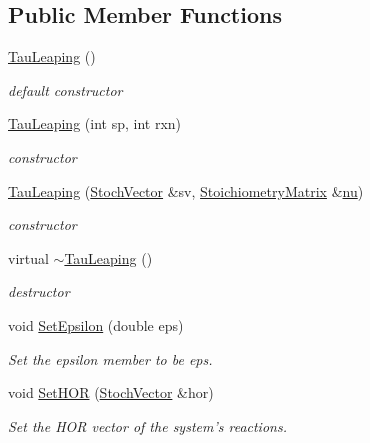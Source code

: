 \subsection*{Public Member Functions}
\begin{CompactItemize}
\item 
\hyperlink{class_tau_leaping_0b7100b89eabbf43b3a4a4b9de08ae8d}{TauLeaping} ()
\begin{CompactList}\small\item\em default constructor \item\end{CompactList}\item 
\hyperlink{class_tau_leaping_55c19c05a81f7d15dcc0e90b9d94ad40}{TauLeaping} (int sp, int rxn)
\begin{CompactList}\small\item\em constructor \item\end{CompactList}\item 
\hyperlink{class_tau_leaping_b3cbfbd6c09180620933fb1eeb5d18e9}{TauLeaping} (\hyperlink{class_stoch_vector}{StochVector} \&sv, \hyperlink{class_stoichiometry_matrix}{StoichiometryMatrix} \&\hyperlink{class_base_system_d664dd55778f4e00a06cb3583b4c27e8}{nu})
\begin{CompactList}\small\item\em constructor \item\end{CompactList}\item 
virtual \hyperlink{class_tau_leaping_fae28db193468defe60a2d27a4e0b0bd}{$\sim$TauLeaping} ()
\begin{CompactList}\small\item\em destructor \item\end{CompactList}\item 
void \hyperlink{class_tau_leaping_a91ab3cda9053416a602abab6e5ac2a8}{SetEpsilon} (double eps)
\begin{CompactList}\small\item\em Set the epsilon member to be eps. \item\end{CompactList}\item 
void \hyperlink{class_tau_leaping_9b2d7a3f01522e9b5ca70702a55d1028}{SetHOR} (\hyperlink{class_stoch_vector}{StochVector} \&hor)
\begin{CompactList}\small\item\em Set the HOR vector of the system's reactions. \item\end{CompactList}\item 

\end{CompactItemize}
